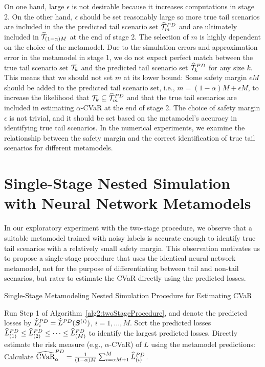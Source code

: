 On one hand, large $\epsilon$ is not desirable because it increases computations in stage 2.
On the other hand, $\epsilon$ should be set reasonably large so more true tail scenarios are included in the the predicted tail scenario set $\widehat{\mathcal{T}}_{m}^{PD}$ and are ultimately included in $\widehat{\mathcal{T}}_{(1-\alpha )M}$ at the end of stage 2.
The selection of $m$ is highly dependent on the choice of the metamodel.
Due to the simulation errors and approximation error in the metamodel in stage 1, we do not expect perfect match between the true tail scenario set $\mathcal{T}_{k}$ and the predicted tail scenario set $\widehat{\mathcal{T}}_{k}^{PD}$ for any size $k$.
This means that we should not set $m$ at its lower bound: Some safety margin $\epsilon M$ should be added to the predicted tail scenario set, i.e., $m = (1-\alpha )M + \epsilon M$, to increase the likelihood that $\mathcal{T}_{k} \subseteq \widehat{\mathcal{T}}_{m}^{PD}$ and that the true tail scenarios are included in estimating $\alpha$-CVaR at the end of stage 2.
The choice of safety margin $\epsilon$ is not trivial, and it should be set based on the metamodel's accuracy in identifying true tail scenarios.
In the numerical experiments, we examine the relationship between the safety margin and the correct identification of true tail scenarios for different metamodels.

\section{Single-Stage Nested Simulation with Neural Network Metamodels} \label{sec2:metamodel1Stage}

In our exploratory experiment with the two-stage procedure, we observe that a suitable metamodel trained with noisy labels is accurate enough to identify true tail scenarios with a relatively small safety margin.
This observation motivates us to propose a single-stage procedure that uses the identical neural network metamodel, not for the purpose of differentiating between tail and non-tail scenarios, but rater to estimate the CVaR directly using the predicted losses. 

\begin{algorithm}
\caption{Single-Stage Metamodeling Nested Simulation Procedure for Estimating CVaR}
\begin{algorithmic}[1] \label{alg2:oneStageProcedure}
    \STATE Run Step 1 of Algorithm~\ref{alg2:twoStageProcedure}, and denote the predicted losses by
    $\widehat{L}^{PD}_i = \widehat{L}^{PD}(\bm{S}^{(i)})$, $i=1,\ldots,M$.
    \STATE Sort the predicted losses $\widehat{L}^{PD}_{(1)}\leq \widehat{L}^{PD}_{(2)} \leq \cdots\leq \widehat{L}^{PD}_{(M)}$ to identify the largest predicted losses. 
    \STATE Directly estimate the risk measure (e.g., $\alpha$-CVaR) of $L$ using the metamodel predictions: Calculate $\widehat{\mbox{CVaR}}^{PD}_\alpha = \frac{1}{(1-\alpha)M} \sum_{i=\alpha M + 1}^{M}\widehat{L}^{PD}_{(i)}$.
\end{algorithmic}
\end{algorithm}

